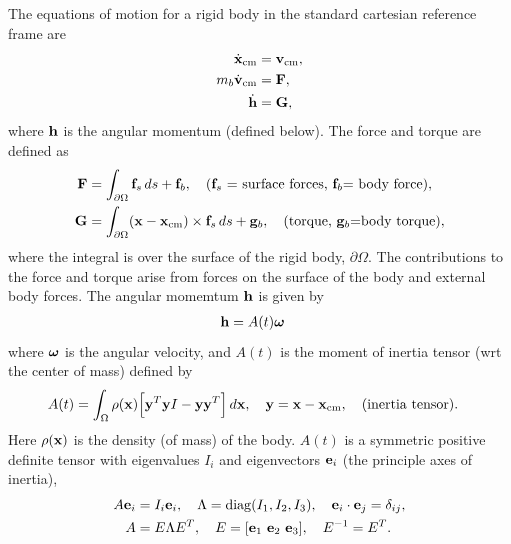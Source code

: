 The equations of motion for a rigid body in the standard cartesian reference frame are
\begin{align*}
   \dot{\mathbf{ x}}_{\rm cm} &= \mathbf{ v}_{\rm cm} , \\
   m_{b} \dot{\mathbf{ v}}_{\rm cm} &= \mathbf{ F} ,\\
   \dot {\mathbf{ h}} &= \mathbf{ G} , 
\end{align*}
where $\mathbf{ h}$ is the angular momentum (defined below). 
The force and torque are defined as 
\begin{align*}
   \mathbf{ F} &= \int_{\partial\Omega} \mathbf{ f}_s\, ds + \mathbf{ f}_b, \quad \text{($\mathbf{ f}_s$ = surface forces, $\mathbf{ f}_b$= body force)},\\
   \mathbf{ G} &= \int_{\partial\Omega} (\mathbf{ x}-\mathbf{ x}_{\rm cm})\times\mathbf{ f}_s\, ds + \mathbf{ g}_b, \quad \text{(torque, $\mathbf{ g}_b$=body torque)}, 
\end{align*}
where the integral is over the surface of the rigid body, $\partial\Omega$. The
contributions to the force and torque arise from forces on the surface of the body and external body forces. 
The angular momemtum $\mathbf{ h}$ is given by
\begin{align*}
   \mathbf{ h} & = A(t) \boldsymbol{\omega} 
\end{align*}
where $\boldsymbol{\omega}$ is the angular velocity,
and $A(t)$ is the moment of inertia tensor (wrt the center of mass) defined  by
\begin{align*}
   A(t) &= \int_{\Omega} \rho(\mathbf{ x})\Big[ \mathbf{ y}^T\mathbf{ y} I - \mathbf{ y}\mathbf{ y}^T \Big] \, d\mathbf{ x} , \quad \mathbf{ y} = \mathbf{ x}-\mathbf{ x}_{\rm cm}, \quad \text{(inertia tensor)}. 
\end{align*}
Here $\rho(\mathbf{ x})$ is the density (of mass) of the body.
$A(t)$ is a symmetric positive definite tensor with eigenvalues $I_i$ and eigenvectors $\mathbf{ e}_i$ (the principle axes of inertia), 
\begin{align*}
   A\mathbf{ e}_i &= I_i \mathbf{ e}_i, \quad \Lambda ={\rm diag}(I_1,I_2,I_3), \quad \mathbf{ e}_i\cdot\mathbf{ e}_j=\delta_{ij}, \\
   A &= E \Lambda E^T, \quad E =[\mathbf{ e}_1~ \mathbf{ e}_2~ \mathbf{ e}_3], \quad E^{-1}=E^T. 
\end{align*}
